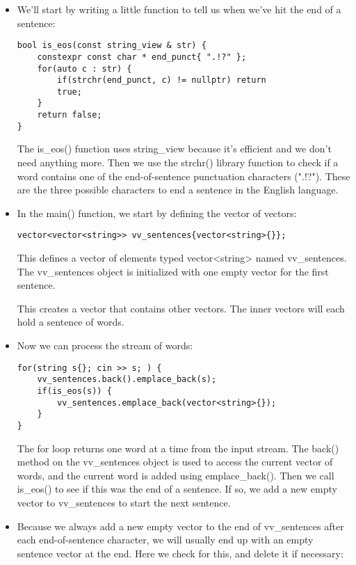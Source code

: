 \begin{itemize}
\item 
We'll start by writing a little function to tell us when we've hit the end of a sentence:

\begin{lstlisting}[style=styleCXX]
bool is_eos(const string_view & str) {
	constexpr const char * end_punct{ ".!?" };
	for(auto c : str) {
		if(strchr(end_punct, c) != nullptr) return
		true;
	}
	return false;
}
\end{lstlisting}

The is\_eos() function uses string\_view because it's efficient and we don't need anything more. Then we use the strchr() library function to check if a word contains one of the end-of-sentence punctuation characters (".!?"). These are the three possible characters to end a sentence in the English language.

\item 
In the main() function, we start by defining the vector of vectors:

\begin{lstlisting}[style=styleCXX]
vector<vector<string>> vv_sentences{vector<string>{}};
\end{lstlisting}

This defines a vector of elements typed vector<string> named vv\_sentences. The vv\_sentences object is initialized with one empty vector for the first sentence.

This creates a vector that contains other vectors. The inner vectors will each hold a sentence of words.

\item 
Now we can process the stream of words:

\begin{lstlisting}[style=styleCXX]
for(string s{}; cin >> s; ) {
	vv_sentences.back().emplace_back(s);
	if(is_eos(s)) {
		vv_sentences.emplace_back(vector<string>{});
	}
}
\end{lstlisting}

The for loop returns one word at a time from the input stream. The back() method on the vv\_sentences object is used to access the current vector of words, and the current word is added using emplace\_back(). Then we call is\_eos() to see if this was the end of a sentence. If so, we add a new empty vector to vv\_sentences to start the next sentence.

\item 
Because we always add a new empty vector to the end of vv\_sentences after each end-of-sentence character, we will usually end up with an empty sentence vector at the end. Here we check for this, and delete it if necessary:


\end{itemize}
